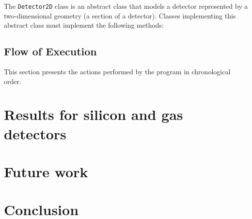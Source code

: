 \documentclass[11pt]{article}
\begin{document}
The \texttt{Detector2D} class is an abstract class that models a detector
represented by a two-dimensional geometry (a section of a detector). Classes
implementing this abstract class must implement the following methods:
%
%
%
%
%
%
%
%
%
%
%
%
%


\subsection{Flow of Execution}

This section presents the actions performed by the program in chronological
order.




\section{Results for silicon and gas detectors}

\section{Future work}

\section{Conclusion}

\newpage



\end{document}
